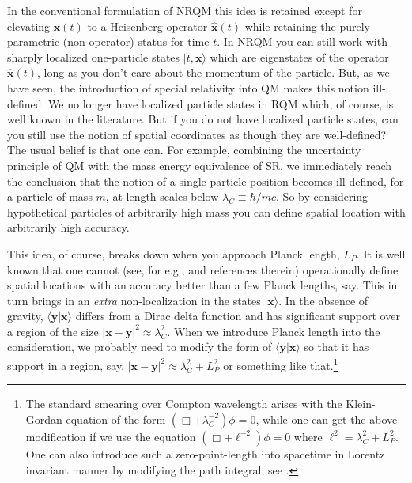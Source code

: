 \documentclass{article}
\def\ket#1{|#1\rangle}                    %
\def\amp#1#2{\langle #1 | #2\rangle}      %
\begin{document}
In the conventional formulation of NRQM this idea is retained except for elevating $\bm{x}(t)$ to a Heisenberg operator $\hat{\bm{x}} (t)$ while retaining the purely parametric  (non-operator) status for time $t$. In NRQM you can still work with sharply localized one-particle states $\ket{t,\bm{x}}$ which are eigenstates of the operator $\hat{\bm{x}}(t)$, long as you don't care about the momentum of the particle. 
But, as we have seen,  the introduction of special relativity into QM makes this notion ill-defined. We no longer have localized particle states in RQM which, of course, is well known in the literature. But if you do not have localized particle states, can you still use the notion of spatial coordinates as though they are well-defined? The usual belief is that one can. For example, combining  the uncertainty principle of QM with the mass energy equivalence of SR, we immediately reach the conclusion that the notion of a single particle position becomes ill-defined, for a particle of mass $m$, at length scales below $\lambda_C \equiv \hbar/mc$.
So by considering hypothetical particles of arbitrarily high mass you can define spatial location with arbitrarily high accuracy. 

This idea, of course, breaks down when you approach Planck length, $L_P$. It is well known that one cannot (see, for e.g., \cite{tplp2,tplp1} and references therein) operationally define spatial locations with an accuracy better than a few Planck lengths, say. This in turn brings in an \textit{extra} non-localization  in the states $\ket{\bm{x}}$. In the absence of gravity, $\amp{\bm{y}}{\bm{x}}$ differs from a Dirac delta function and has significant support over a region of the size $|\bm{x}-\bm{y}|^2 \approx \lambda_C^2$. When we introduce Planck length into the consideration, we probably need to modify the form of  $\amp{\bm{y}}{\bm{x}}$ so that it has support in a region, say, $|\bm{x}-\bm{y}|^2 \approx \lambda_C^2+ L_P^2$ or something like that.\footnote{The standard smearing over Compton wavelength arises with the Klein-Gordan equation of the form $(\Box + \lambda_C^{-2})\phi =0$, while one can get the above modification if we use the equation $(\Box + \ell^{-2})\phi =0$ where $\ell^2 = \lambda_C^2 + L_P^2$. One can also introduce such a zero-point-length into spacetime in Lorentz invariant manner by modifying the path integral; see \cite{pid1,pid2}.} 
\end{document}
